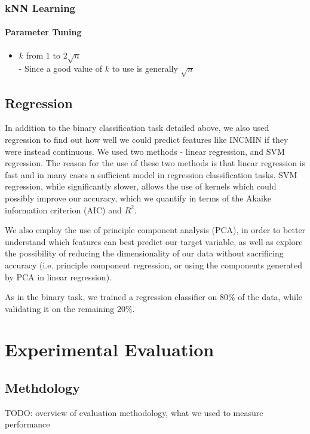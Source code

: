 \documentclass[11pt,letter]{article}
\begin{document}
\subsubsection{kNN Learning}

\paragraph{Parameter Tuning}
\begin{itemize}
	\item $k$ from $1$ to $2\sqrt{n}$ \\
		- Since a good value of $k$ to use is generally $\sqrt{n}$
\end{itemize}

\subsection{Regression}
In addition to the binary classification task detailed above, we also used regression to find out how well we could predict features like INCMIN if they were instead continuous. We used two methods - linear regression, and SVM regression. The reason for the use of these two methods is that linear regression is fast and in many cases a sufficient model in regression classification tasks. SVM regression, while significantly slower, allows the use of kernels which could possibly improve our accuracy, which we quantify in terms of the Akaike information criterion (AIC) and $R^2$.

We also employ the use of principle component analysis (PCA), in order to better understand which features can best predict our target variable, as well as explore the possibility of reducing the dimensionality of our data without sacrificing accuracy (i.e. principle component regression, or using the components generated by PCA in linear regression).

As in the binary task, we trained a regression classifier on 80\% of the data, while validating it on the remaining 20\%.

\section{Experimental Evaluation}
\subsection{Methdology}
TODO: overview of evaluation methodology, what we used to measure performance
\end{document}

